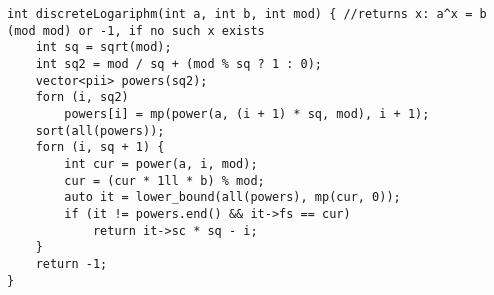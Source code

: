 \begin{verbatim}
int discreteLogariphm(int a, int b, int mod) { //returns x: a^x = b (mod mod) or -1, if no such x exists
	int sq = sqrt(mod);
	int sq2 = mod / sq + (mod % sq ? 1 : 0);
	vector<pii> powers(sq2);
	forn (i, sq2)
		powers[i] = mp(power(a, (i + 1) * sq, mod), i + 1);
	sort(all(powers));
	forn (i, sq + 1) {
	 	int cur = power(a, i, mod);
	 	cur = (cur * 1ll * b) % mod;
	 	auto it = lower_bound(all(powers), mp(cur, 0));
	 	if (it != powers.end() && it->fs == cur)
	 		return it->sc * sq - i;
	}	
	return -1;
}
\end{verbatim}
